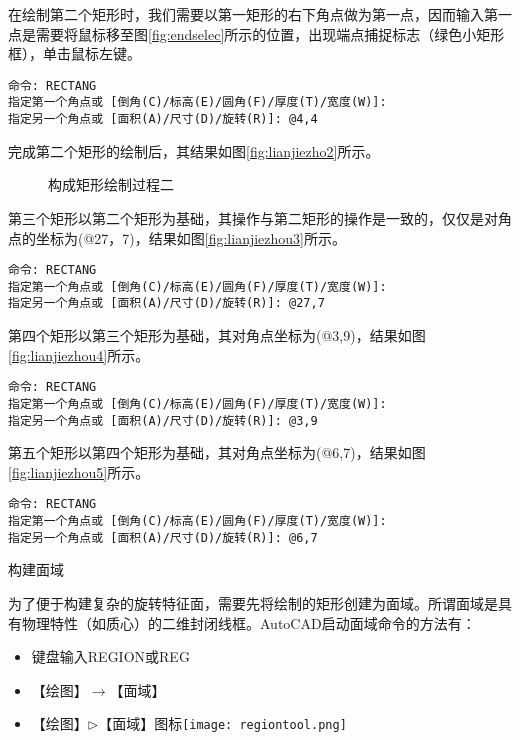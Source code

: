 \begin{procedure}
在绘制第二个矩形时，我们需要以第一矩形的右下角点做为第一点，因而输入第一点是需要将鼠标移至图\ref{fig:endselec}所示的位置，出现端点捕捉标志（绿色小矩形框），单击鼠标左键。
\begin{lstlisting}
命令: RECTANG
指定第一个角点或 [倒角(C)/标高(E)/圆角(F)/厚度(T)/宽度(W)]:
指定另一个角点或 [面积(A)/尺寸(D)/旋转(R)]: @4,4
\end{lstlisting}

完成第二个矩形的绘制后，其结果如图\ref{fig:lianjiezho2}所示。
\begin{figure}[htbp]
\centering
{}\hspace{20pt}
\caption{构成矩形绘制过程二}
\end{figure}
第三个矩形以第二个矩形为基础，其操作与第二矩形的操作是一致的，仅仅是对角点的坐标为(@27，7)，结果如图\ref{fig:lianjiezhou3}所示。
\begin{lstlisting}
命令: RECTANG
指定第一个角点或 [倒角(C)/标高(E)/圆角(F)/厚度(T)/宽度(W)]:
指定另一个角点或 [面积(A)/尺寸(D)/旋转(R)]: @27,7
\end{lstlisting}
第四个矩形以第三个矩形为基础，其对角点坐标为(@3,9)，结果如图\ref{fig:lianjiezhou4}所示。
\begin{lstlisting}
命令: RECTANG
指定第一个角点或 [倒角(C)/标高(E)/圆角(F)/厚度(T)/宽度(W)]:
指定另一个角点或 [面积(A)/尺寸(D)/旋转(R)]: @3,9
\end{lstlisting}
第五个矩形以第四个矩形为基础，其对角点坐标为(@6,7)，结果如图\ref{fig:lianjiezhou5}所示。
\begin{lstlisting}
命令: RECTANG
指定第一个角点或 [倒角(C)/标高(E)/圆角(F)/厚度(T)/宽度(W)]:
指定另一个角点或 [面积(A)/尺寸(D)/旋转(R)]: @6,7
\end{lstlisting}
\item 构建面域

为了便于构建复杂的旋转特征面，需要先将绘制的矩形创建为面域。所谓面域是具有物理特性（如质心）的二维封闭线框。AutoCAD启动面域命令的方法有：
\begin{itemize}
\item 键盘输入REGION或REG
\item 【绘图】$\rightarrow$【面域】
\item 【绘图】$\triangleright$【面域】图标\texttt{[image: regiontool.png]}
\end{itemize}


\end{procedure}
